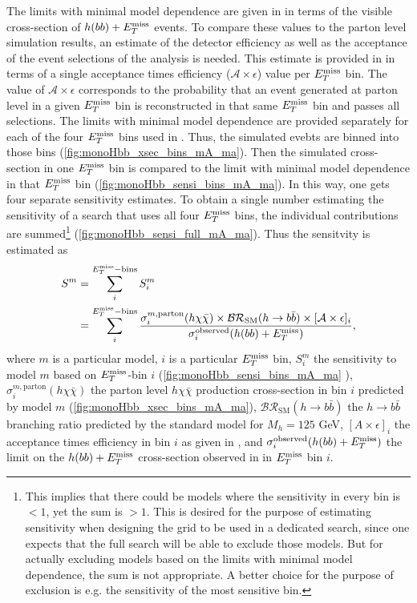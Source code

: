 The limits with minimal model dependence are given in \cite{Aaboud:2017yqz} in terms of the visible cross-section of $h(bb)+E_T^\mathrm{miss}$ events. 
To compare these values to the parton level simulation results, 
an estimate of the detector efficiency as well as the acceptance of the event selections of the analysis is needed.
This estimate  is provided in \cite{Aaboud:2017yqz} in terms of a single acceptance times efficiency ($\mathcal{A\times\epsilon}$) value per $E_T^\mathrm{miss}$ bin. 
The value of $\mathcal{A\times\epsilon}$ corresponds to the probability
 that an event generated at parton level in a given $E_T^\mathrm{miss}$ bin is reconstructed in that same $E_T^\mathrm{miss}$ bin and passes all selections.
The limits with minimal model dependence are provided separately for each of the four $E_T^\mathrm{miss}$ bins used in \cite{Aaboud:2017yqz}.
Thus, the simulated evebts are binned into those bins (\autoref{fig:monoHbb_xsec_bins_mA_ma}).
Then the simulated cross-section in one $E_T^\mathrm{miss}$ bin is compared to the 
limit with minimal model dependence in that $E_T^\mathrm{miss}$ bin (\autoref{fig:monoHbb_sensi_bins_mA_ma}). 
In this way, one gets four separate sensitivity estimates.
To obtain a single number estimating the sensitivity of a search that uses all four $E_T^\mathrm{miss}$ bins, 
the individual contributions are summed\footnote{This implies that there could be models where the sensitivity in every bin is $<1$, yet the sum is $>1$. 
This is desired for the purpose of estimating sensitivity when designing the grid to be used in a dedicated search, 
since one expects that the full search will be able to exclude those models. 
But for actually excluding models based on the limits with minimal model dependence, the sum is not appropriate.
A better choice for the purpose of exclusion is e.g. the sensitivity of the most sensitive bin.} (\autoref{fig:monoHbb_sensi_full_mA_ma}).
Thus the sensitvity is estimated as
\begin{align}
\label{eq:monoHbb_sensi}
\begin{split}
S^{m} & =  \sum^{E_T^\mathrm{miss}\mathrm{-bins}}_{i} S_{i}^{m} \\ & = \sum^{E_T^\mathrm{miss}\mathrm{-bins}}_{i} 
\frac{\sigma_{i}^{m,\mathrm{parton}}(h \chi\bar{\chi}) \times \mathcal{BR}_{\mathrm{SM}}(h\rightarrow b\bar{b}) \times [\mathcal{A\times\epsilon}]_{i} }{\sigma_{i}^{\mathrm{observed}}(h(bb)+E_T^\mathrm{miss})} ,
\end{split}
\end{align}
where $m$ is a particular model, $i$ is a particular $E_T^\mathrm{miss}$ bin, 
$S_{i}^{m}$ the sensitivity to model $m$ based on $E_T^\mathrm{miss}$-bin $i$ (\autoref{fig:monoHbb_sensi_bins_mA_ma} ), 
$\sigma_{i}^{m,\mathrm{parton}}(h \chi\bar{\chi})$ the parton level $h\chi\bar{\chi}$ production cross-section 
in bin $i$  predicted by model $m$ (\autoref{fig:monoHbb_xsec_bins_mA_ma}),
$\mathcal{BR}_{\mathrm{SM}}(h\rightarrow b\bar{b})$ the $h\rightarrow b\bar{b}$ branching ratio predicted by the standard model for $M_h = 125$ GeV, 
$[A\times\epsilon]_{i}$ the acceptance times efficiency in bin $i$ as given in \cite{Aaboud:2017yqz},
and $\sigma_{i}^{\mathrm{observed}}(h(bb)+E_T^\mathrm{miss})$ the limit on the $h(bb)+E_T^\mathrm{miss}$ cross-section observed in \cite{Aaboud:2017yqz} in $E_T^\mathrm{miss}$ bin $i$.

